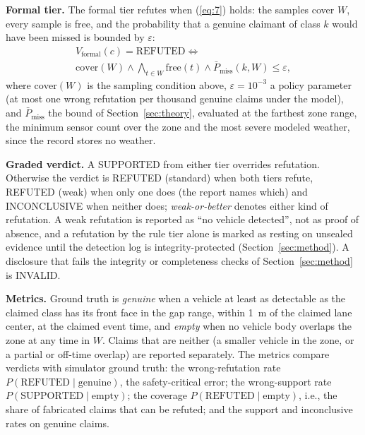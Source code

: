 \textbf{Formal tier.} The formal tier refutes when (\ref{eq:7}) holds: the samples cover $W$, every sample is free, and the probability that a genuine claimant of class $k$ would have been missed is bounded by $\varepsilon$:
\begin{multline}
V_{\mathrm{formal}}(c) = \text{REFUTED} \iff \\
\mathrm{cover}(W) \wedge \textstyle\bigwedge_{t \in W} \mathrm{free}(t) \wedge \bar P_{\mathrm{miss}}(k, W) \le \varepsilon,
\label{eq:7}
\end{multline}
where $\mathrm{cover}(W)$ is the sampling condition above, $\varepsilon = 10^{-3}$ a policy parameter (at most one wrong refutation per thousand genuine claims under the model), and $\bar P_{\mathrm{miss}}$ the bound of Section~\ref{sec:theory}, evaluated at the farthest zone range, the minimum sensor count over the zone and the most severe modeled weather, since the record stores no weather.

\textbf{Graded verdict.} A SUPPORTED from either tier overrides refutation. Otherwise the verdict is REFUTED (standard) when both tiers refute, REFUTED (weak) when only one does (the report names which) and INCONCLUSIVE when neither does; \emph{weak-or-better} denotes either kind of refutation. A weak refutation is reported as ``no vehicle detected'', not as proof of absence, and a refutation by the rule tier alone is marked as resting on unsealed evidence until the detection log is integrity-protected (Section~\ref{sec:method}). A disclosure that fails the integrity or completeness checks of Section~\ref{sec:method} is INVALID.

\textbf{Metrics.} Ground truth is \emph{genuine} when a vehicle at least as detectable as the claimed class has its front face in the gap range, within 1~m of the claimed lane center, at the claimed event time, and \emph{empty} when no vehicle body overlaps the zone at any time in $W$. Claims that are neither (a smaller vehicle in the zone, or a partial or off-time overlap) are reported separately. The metrics compare verdicts with simulator ground truth: the wrong-refutation rate $P(\text{REFUTED}\mid\text{genuine})$, the safety-critical error; the wrong-support rate $P(\text{SUPPORTED}\mid\text{empty})$; the coverage $P(\text{REFUTED}\mid\text{empty})$, i.e., the share of fabricated claims that can be refuted; and the support and inconclusive rates on genuine claims.

